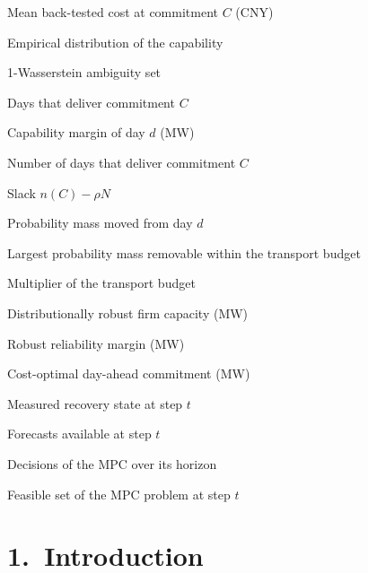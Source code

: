 \documentclass[a4paper,twocolumn,fleqn,10pt]{article}
\begin{document}
{\begin{nomlist}
\item[{\(\bar J(C)\)}] Mean back-tested cost at commitment \(C\) (CNY)
\item[{\(\hat P_N\)}] Empirical distribution of the capability
\item[{\(\mathcal B_\varepsilon(\hat P_N)\)}] 1-Wasserstein ambiguity set
\item[{\(\mathcal D_C\)}] Days that deliver commitment \(C\)
\item[{\(\delta_d(C)\)}] Capability margin of day \(d\) (MW)
\item[{\(n(C)\)}] Number of days that deliver commitment \(C\)
\item[{\(q(C)\)}] Slack \(n(C)-\rho N\)
\item[{\(w_d\)}] Probability mass moved from day \(d\)
\item[{\(m^*_C(\varepsilon)\)}] Largest probability mass removable within the transport budget
\item[{\(\lambda\)}] Multiplier of the transport budget
\item[{\(C^{DRO}_\rho(\varepsilon)\)}] Distributionally robust firm capacity (MW)
\item[{\(\Phi_\rho(C)\)}] Robust reliability margin (MW)
\item[{\(C^*\)}] Cost-optimal day-ahead commitment (MW)
\item[{\(\hat{\mathbf x}_t\)}] Measured recovery state at step \(t\)
\item[{\(\hat{\mathbf w}_{\cdot|t}\)}] Forecasts available at step \(t\)
\item[{\(\mathbf u\)}] Decisions of the MPC over its horizon
\item[{\(\mathcal U_t\)}] Feasible set of the MPC problem at step \(t\)
\end{nomlist}
}

\section*{1.~Introduction}
\end{document}
